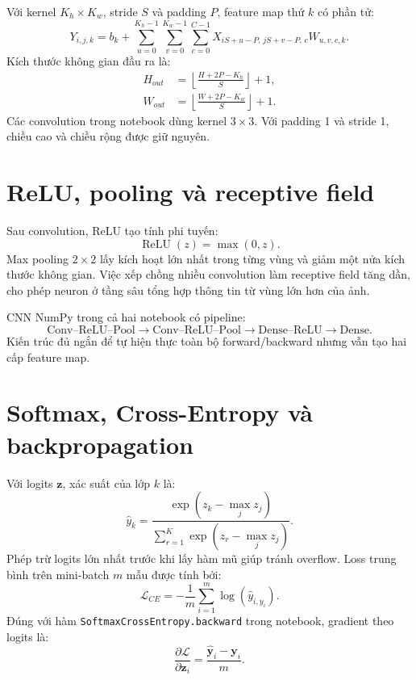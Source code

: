 \documentclass[12pt,a4paper]{report}
\begin{document}
Với kernel $K_h\times K_w$, stride $S$ và padding $P$, feature map thứ $k$ có
phần tử:
\begin{equation}
Y_{i,j,k}=b_k+
\sum_{u=0}^{K_h-1}
\sum_{v=0}^{K_w-1}
\sum_{c=0}^{C-1}
X_{iS+u-P,\,jS+v-P,\,c}W_{u,v,c,k}.
\end{equation}
Kích thước không gian đầu ra là:
\begin{align}
H_{out} &= \left\lfloor\frac{H+2P-K_h}{S}\right\rfloor+1,\\
W_{out} &= \left\lfloor\frac{W+2P-K_w}{S}\right\rfloor+1.
\end{align}
Các convolution trong notebook dùng kernel $3\times3$. Với padding 1 và stride
1, chiều cao và chiều rộng được giữ nguyên.

\section{ReLU, pooling và receptive field}
Sau convolution, ReLU tạo tính phi tuyến:
\begin{equation}
    \operatorname{ReLU}(z)=\max(0,z).
\end{equation}
Max pooling $2\times2$ lấy kích hoạt lớn nhất trong từng vùng và giảm một nửa
kích thước không gian. Việc xếp chồng nhiều convolution làm receptive field
tăng dần, cho phép neuron ở tầng sâu tổng hợp thông tin từ vùng lớn hơn của ảnh.

CNN NumPy trong cả hai notebook có pipeline:
\begin{equation}
\text{Conv--ReLU--Pool}
\to\text{Conv--ReLU--Pool}
\to\text{Dense--ReLU}
\to\text{Dense}.
\end{equation}
Kiến trúc đủ ngắn để tự hiện thực toàn bộ forward/backward nhưng vẫn tạo hai cấp
feature map.

\section{Softmax, Cross-Entropy và backpropagation}
Với logits $\mathbf{z}$, xác suất của lớp $k$ là:
\begin{equation}
    \hat{y}_k=\frac{\exp(z_k-\max_j z_j)}
    {\sum_{r=1}^{K}\exp(z_r-\max_j z_j)}.
\end{equation}
Phép trừ logits lớn nhất trước khi lấy hàm mũ giúp tránh overflow. Loss trung
bình trên mini-batch $m$ mẫu được tính bởi:
\begin{equation}
    \mathcal{L}_{CE}=-\frac{1}{m}\sum_{i=1}^{m}
    \log\!\left(\hat{y}_{i,y_i}\right).
\end{equation}
Đúng với hàm \texttt{SoftmaxCrossEntropy.backward} trong notebook, gradient theo
logits là:
\begin{equation}
    \frac{\partial\mathcal{L}}{\partial\mathbf{z}_i}
    =\frac{\hat{\mathbf{y}}_i-\mathbf{y}_i}{m}.
\end{equation}
\end{document}
